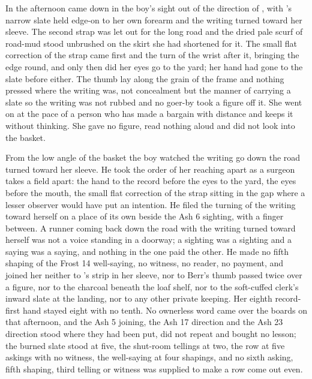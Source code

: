 \scenebreak

In the afternoon  came down  in the boy's sight out of the direction of , with 's narrow slate held edge-on to her own forearm and the writing turned toward her sleeve. The second strap was let out for the long road and the dried pale scurf of road-mud stood unbrushed on the skirt she had shortened for it. The small flat correction of the strap came first and the turn of the wrist after it, bringing the edge round, and only then did her eyes go to the yard; her hand had gone to the slate before either. The thumb lay along the grain of the frame and nothing pressed where the writing was, not concealment but the manner of carrying a slate so the writing was not rubbed and no goer-by took a figure off it. She went on at the pace of a person who has made a bargain with distance and keeps it without thinking. She gave no figure, read nothing aloud and did not look into the basket.

From the low angle of the basket the boy watched the writing go down the road turned toward her sleeve. He took the order of her reaching apart as a surgeon takes a field apart: the hand to the record before the eyes to the yard, the eyes before the mouth, the small flat correction of the strap sitting in the gap where a lesser observer would have put an intention. He filed the turning of the writing toward herself on a place of its own beside the Ash 6 sighting, with a finger between. A runner coming back down the road with the writing turned toward herself was not a voice standing in a doorway; a sighting was a sighting and a saying was a saying, and nothing in the one paid the other. He made no fifth shaping of the Frost 14 well-saying, no witness, no reader, no payment, and joined her neither to 's strip in her sleeve, nor to Berr's thumb passed twice over a figure, nor to the charcoal beneath the loaf shelf, nor to the soft-cuffed clerk's inward slate at the landing, nor to any other private keeping. Her eighth record-first hand stayed eight with no tenth. No ownerless word came over the boards on that afternoon, and the Ash 5 joining, the Ash 17 direction and the Ash 23 direction stood where they had been put, did not repeat and bought no lesson; the burned slate stood at five, the shut-room tellings at two, the row at five askings with no witness, the well-saying at four shapings, and no sixth asking, fifth shaping, third telling or witness was supplied to make a row come out even.

